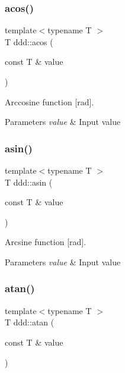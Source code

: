 \subsubsection{\texorpdfstring{acos()}{acos()}}
{\footnotesize\ttfamily template$<$typename T $>$ \\
T ddd\+::acos (\begin{DoxyParamCaption}\item[{const T \&}]{value }\end{DoxyParamCaption})\hspace{0.3cm}{\ttfamily [inline]}}



Arccosine function \mbox{[}rad\mbox{]}. 


\begin{DoxyParams}{Parameters}
{\em value} & Input value \\
\hline
\end{DoxyParams}
\mbox{\label{namespaceddd_af887d6f09da2128f99b36b034ab2ed1f}} 
\subsubsection{\texorpdfstring{asin()}{asin()}}
{\footnotesize\ttfamily template$<$typename T $>$ \\
T ddd\+::asin (\begin{DoxyParamCaption}\item[{const T \&}]{value }\end{DoxyParamCaption})\hspace{0.3cm}{\ttfamily [inline]}}



Arcsine function \mbox{[}rad\mbox{]}. 


\begin{DoxyParams}{Parameters}
{\em value} & Input value \\
\hline
\end{DoxyParams}
\mbox{\label{namespaceddd_a750f7cad6893bbbfbaa51353044bde4f}} 
\subsubsection{\texorpdfstring{atan()}{atan()}}
{\footnotesize\ttfamily template$<$typename T $>$ \\
T ddd\+::atan (\begin{DoxyParamCaption}\item[{const T \&}]{value }\end{DoxyParamCaption})\hspace{0.3cm}{\ttfamily [inline]}}



